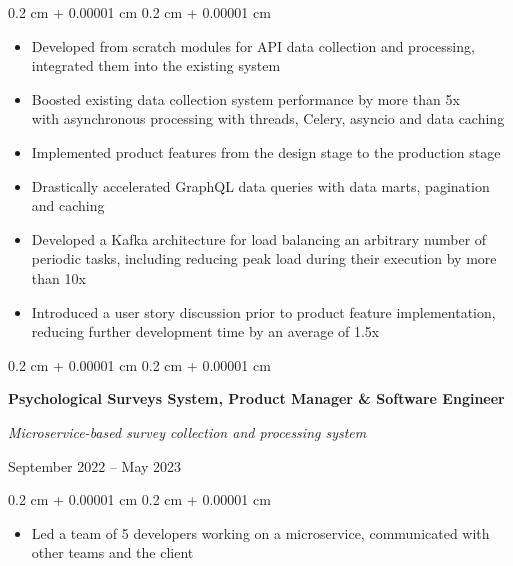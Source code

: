 \documentclass[10pt, letterpaper]{article}
\newenvironment{highlights}{
    \begin{itemize}[
        topsep=0.10 cm,
        parsep=0.10 cm,
        partopsep=0pt,
        itemsep=0pt,
        leftmargin=0.4 cm + 10pt
    ]
}{
    \end{itemize}
} %
\newenvironment{onecolentry}{
    \begin{adjustwidth}{
        0.2 cm + 0.00001 cm
    }{
        0.2 cm + 0.00001 cm
    }
}{
    \end{adjustwidth}
} %
\newenvironment{twocolentry}[2][]{
    \onecolentry
    \def\secondColumn{#2}
    \setcolumnwidth{\fill, 5 cm}
    \begin{paracol}{2}
}{
    \switchcolumn \raggedleft \secondColumn
    \end{paracol}
    \endonecolentry
} %
\begin{document}
        \vspace{0.10 cm}
        \begin{onecolentry}
            \begin{highlights}
                \item Developed from scratch modules for API data collection and processing, integrated them into the existing system
                \item Boosted existing data collection system performance by more than 5x \\ with asynchronous processing with threads, Celery, asyncio and data caching
                \item Implemented product features from the design stage to the production stage
                \item Drastically accelerated GraphQL data queries with data marts, pagination and caching
                \item Developed a Kafka architecture for load balancing an arbitrary number of periodic tasks, including reducing peak load during their execution by more than 10x
                \item Introduced a user story discussion prior to product feature implementation, \\ reducing further development time by an average of 1.5x
            \end{highlights}
        \end{onecolentry}

        \vspace{0.2 cm}

        \begin{twocolentry}{
            
        {September 2022 – May 2023}}
        \textbf{Psychological Surveys System, Product Manager \& Software Engineer}

        \textit{Microservice-based survey collection and processing system}
        \end{twocolentry}

        \vspace{0.10 cm}
        \begin{onecolentry}
            \begin{highlights}
                \item Led a team of 5 developers working on a microservice, communicated with other teams and the client
            \end{highlights}
        \end{onecolentry}
\end{document}
